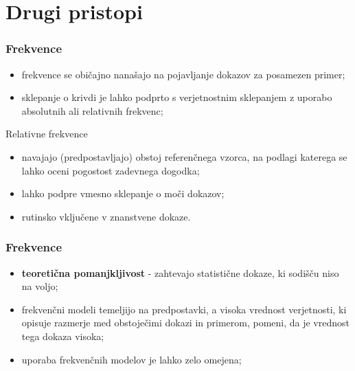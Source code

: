 \documentclass{beamer}
\begin{document}
\section{Drugi pristopi}

\begin{frame}
    \frametitle{Frekvence}
    \begin{itemize}
        \item frekvence se običajno nanašajo na pojavljanje dokazov za posamezen primer;
        \item sklepanje o krivdi je lahko podprto s verjetnostnim sklepanjem z uporabo absolutnih ali relativnih frekvenc;
    \end{itemize}
    \begin{block}{Relativne frekvence}
        \begin{itemize}
            \item navajajo (predpostavljajo) obstoj referenčnega vzorca, na podlagi katerega se lahko oceni pogostost zadevnega dogodka;
            \item lahko podpre vmesno sklepanje o moči dokazov;
            \item rutinsko vključene v znanstvene dokaze.
        \end{itemize}  
    \end{block}
\end{frame}

\begin{frame}
    \frametitle{Frekvence}
    \begin{itemize}
        \item \textbf{teoretična pomanjkljivost} - zahtevajo statistične dokaze, ki sodišču niso na voljo;
        \item frekvenčni modeli temeljijo na predpostavki, a visoka vrednost verjetnosti, ki opisuje razmerje med obstoječimi dokazi in primerom, pomeni, da je vrednost tega dokaza visoka;
        \item uporaba frekvenčnih modelov je lahko zelo omejena;
    \end{itemize} \vspace{3mm}
\end{frame}
\end{document}
